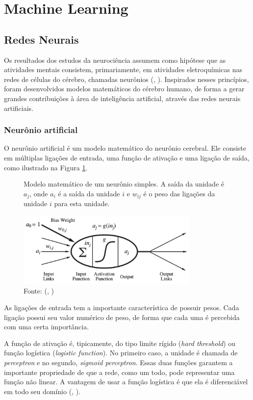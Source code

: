 \documentclass[]{politex}
\begin{document}
\section{Machine Learning}
\subsection{Redes Neurais}
Os resultados dos estudos da neurociência assumem como hipótese que as atividades mentais consistem, primariamente, em atividades eletroquímicas nas redes de células do cérebro, chamadas neurônios (, \citeyear{Russell}). Inspirados nesses princípios, foram desenvolvidos modelos matemáticos do cérebro humano, de forma a gerar grandes contribuições à área de inteligência artificial, através das redes neurais artificiais.

\subsubsection{Neurônio artificial}
O neurônio artificial é um modelo matemático do neurônio cerebral. Ele consiste em múltiplas ligações de entrada, uma função de ativação e uma ligação de saída, como ilustrado na Figura \ref{fig:neuronio}.

\begin{figure}[H]
    \centering
    \caption{Modelo matemático de um neurônio simples. A saída da unidade é \(a_j\), onde \(a_i\) é a saída da unidade \(i\) e \(w_{ij}\) é o peso das ligações da unidade \(i\) para esta unidade.}
    \includegraphics[width=0.8\textwidth]{Neuronio}
    \caption*{Fonte: (, \citeyear{Russell})}
    \label{fig:neuronio}
\end{figure}

As ligações de entrada tem a importante característica de possuir pesos. Cada ligação possui seu valor numérico de peso, de forma que cada uma é percebida com uma certa importância.

A função de ativação é, tipicamente, do tipo limite rígido (\textit{hard threshold}) ou função logística (\textit{logistic function}). No primeiro caso, a unidade é chamada de \textit{perceptron} e no segundo, \textit{sigmoid perceptron}. Essas duas funções garantem a importante propriedade de que a rede, como um todo, pode representar uma função não linear. A vantagem de usar a função logística é que ela é diferenciável em todo seu domínio (, \citeyear{Russell}).
\end{document}
